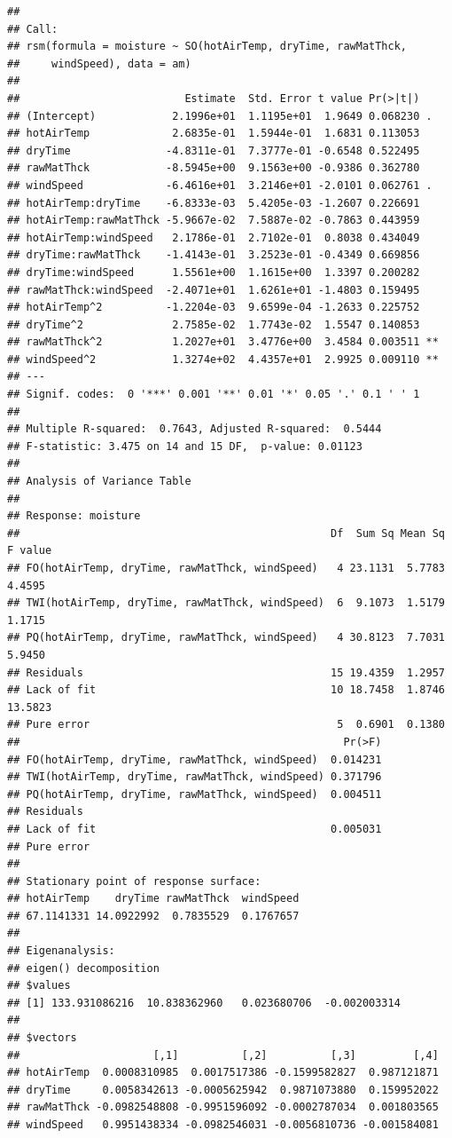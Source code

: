\documentclass[
]{book}
\begin{document}
\begin{verbatim}
## 
## Call:
## rsm(formula = moisture ~ SO(hotAirTemp, dryTime, rawMatThck, 
##     windSpeed), data = am)
## 
##                          Estimate  Std. Error t value Pr(>|t|)   
## (Intercept)            2.1996e+01  1.1195e+01  1.9649 0.068230 . 
## hotAirTemp             2.6835e-01  1.5944e-01  1.6831 0.113053   
## dryTime               -4.8311e-01  7.3777e-01 -0.6548 0.522495   
## rawMatThck            -8.5945e+00  9.1563e+00 -0.9386 0.362780   
## windSpeed             -6.4616e+01  3.2146e+01 -2.0101 0.062761 . 
## hotAirTemp:dryTime    -6.8333e-03  5.4205e-03 -1.2607 0.226691   
## hotAirTemp:rawMatThck -5.9667e-02  7.5887e-02 -0.7863 0.443959   
## hotAirTemp:windSpeed   2.1786e-01  2.7102e-01  0.8038 0.434049   
## dryTime:rawMatThck    -1.4143e-01  3.2523e-01 -0.4349 0.669856   
## dryTime:windSpeed      1.5561e+00  1.1615e+00  1.3397 0.200282   
## rawMatThck:windSpeed  -2.4071e+01  1.6261e+01 -1.4803 0.159495   
## hotAirTemp^2          -1.2204e-03  9.6599e-04 -1.2633 0.225752   
## dryTime^2              2.7585e-02  1.7743e-02  1.5547 0.140853   
## rawMatThck^2           1.2027e+01  3.4776e+00  3.4584 0.003511 **
## windSpeed^2            1.3274e+02  4.4357e+01  2.9925 0.009110 **
## ---
## Signif. codes:  0 '***' 0.001 '**' 0.01 '*' 0.05 '.' 0.1 ' ' 1
## 
## Multiple R-squared:  0.7643, Adjusted R-squared:  0.5444 
## F-statistic: 3.475 on 14 and 15 DF,  p-value: 0.01123
## 
## Analysis of Variance Table
## 
## Response: moisture
##                                                 Df  Sum Sq Mean Sq F value
## FO(hotAirTemp, dryTime, rawMatThck, windSpeed)   4 23.1131  5.7783  4.4595
## TWI(hotAirTemp, dryTime, rawMatThck, windSpeed)  6  9.1073  1.5179  1.1715
## PQ(hotAirTemp, dryTime, rawMatThck, windSpeed)   4 30.8123  7.7031  5.9450
## Residuals                                       15 19.4359  1.2957        
## Lack of fit                                     10 18.7458  1.8746 13.5823
## Pure error                                       5  0.6901  0.1380        
##                                                   Pr(>F)
## FO(hotAirTemp, dryTime, rawMatThck, windSpeed)  0.014231
## TWI(hotAirTemp, dryTime, rawMatThck, windSpeed) 0.371796
## PQ(hotAirTemp, dryTime, rawMatThck, windSpeed)  0.004511
## Residuals                                               
## Lack of fit                                     0.005031
## Pure error                                              
## 
## Stationary point of response surface:
## hotAirTemp    dryTime rawMatThck  windSpeed 
## 67.1141331 14.0922992  0.7835529  0.1767657 
## 
## Eigenanalysis:
## eigen() decomposition
## $values
## [1] 133.931086216  10.838362960   0.023680706  -0.002003314
## 
## $vectors
##                     [,1]          [,2]          [,3]         [,4]
## hotAirTemp  0.0008310985  0.0017517386 -0.1599582827  0.987121871
## dryTime     0.0058342613 -0.0005625942  0.9871073880  0.159952022
## rawMatThck -0.0982548808 -0.9951596092 -0.0002787034  0.001803565
## windSpeed   0.9951438334 -0.0982546031 -0.0056810736 -0.001584081
\end{verbatim}
\end{document}
